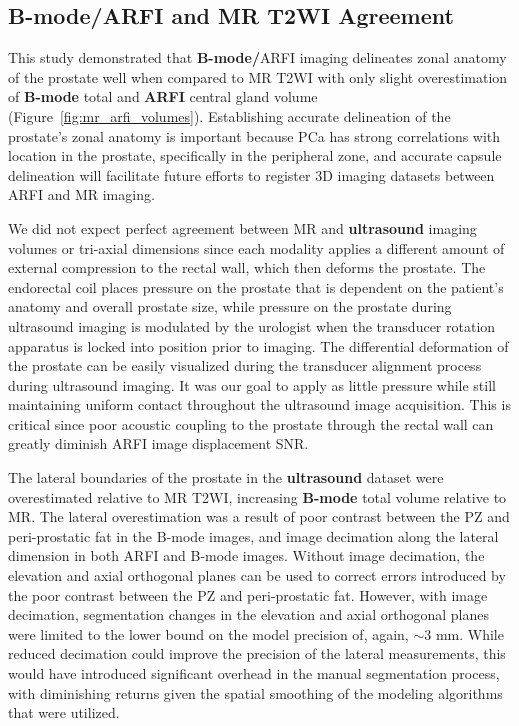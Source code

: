 \subsection{B-mode/ARFI and MR T2WI Agreement}
This study demonstrated that \textbf{B-mode/}ARFI imaging delineates zonal
anatomy of the prostate well when compared to MR T2WI with only slight
overestimation of \textbf{B-mode} total and \textbf{ARFI} central gland volume
(Figure~\ref{fig:mr_arfi_volumes}).  Establishing accurate delineation of the
prostate's zonal anatomy is important because PCa has strong correlations with
location in the prostate, specifically in the peripheral zone, and accurate
capsule delineation will facilitate future efforts to register 3D imaging
datasets between ARFI and MR imaging. 

We did not expect perfect agreement between MR and \textbf{ultrasound} imaging
volumes or tri-axial dimensions since each modality applies a different amount
of external compression to the rectal wall, which then deforms the prostate.
The endorectal coil places pressure on the prostate that is dependent on the
patient's anatomy and overall prostate size, while pressure on the prostate
during ultrasound imaging is modulated by the urologist when the transducer
rotation apparatus is locked into position prior to imaging.  The differential
deformation of the prostate can be easily visualized during the transducer
alignment process during ultrasound imaging.  It was our goal to apply as
little pressure while still maintaining uniform contact throughout the
ultrasound image acquisition. This is critical since poor acoustic coupling to
the prostate through the rectal wall can greatly diminish ARFI image
displacement SNR.

The lateral boundaries of the prostate in the \textbf{ultrasound} dataset were
overestimated relative to MR T2WI, increasing \textbf{B-mode} total volume
relative to MR. The lateral overestimation was a result of poor contrast
between the PZ and peri-prostatic fat in the B-mode images, and image
decimation along the lateral dimension in both ARFI and B-mode images. Without
image decimation, the elevation and axial orthogonal planes can be used to
correct errors introduced by the poor contrast between the PZ and
peri-prostatic fat. However, with image decimation, segmentation changes in the
elevation and axial orthogonal planes were limited to the lower bound on the
model precision of, again, $\sim$3 mm.  While reduced decimation could improve
the precision of the lateral measurements, this would have introduced
significant overhead in the manual segmentation process, with diminishing
returns given the spatial smoothing of the modeling algorithms that were
utilized. 

